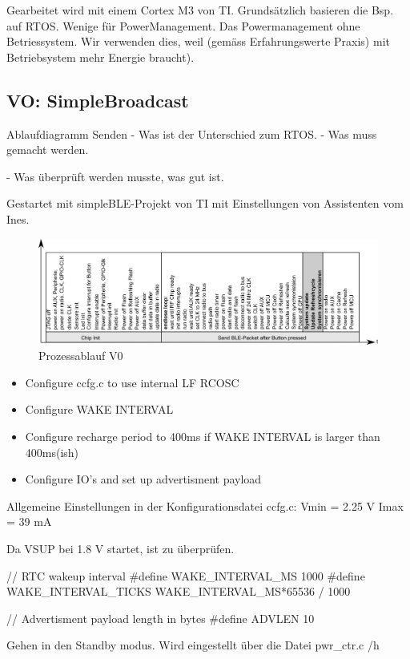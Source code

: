 Gearbeitet wird mit einem Cortex M3 von TI. 
Grundsätzlich basieren die Bsp. auf RTOS. Wenige für PowerManagement. Das Powermanagement ohne Betriessystem. Wir verwenden dies, weil (gemäss Erfahrungswerte Praxis) mit Betriebsystem mehr Energie braucht).

\subsection{VO: SimpleBroadcast}
Ablaufdiagramm Senden
- Was ist der Unterschied zum RTOS.
- Was muss gemacht werden.

- Was überprüft werden musste, was gut ist.

Gestartet mit simpleBLE-Projekt von TI mit Einstellungen von Assistenten vom Ines.

\begin{figure}
  \includegraphics{../ressources/SimpleLink/V0Sendeablauf.png}
  \caption{Prozessablauf V0}
\end{figure}




\begin{itemize}
    \item Configure ccfg.c to use internal LF RCOSC
    \item Configure WAKE INTERVAL
    \item Configure recharge period to 400ms if WAKE INTERVAL is larger than 400ms(ish)
    \item Configure IO's and set up advertisment payload       
\end{itemize}

Allgemeine Einstellungen in der Konfigurationsdatei ccfg.c:
Vmin = 2.25 V
Imax = 39 mA


Da VSUP bei 1.8 V startet, ist zu überprüfen. 


// RTC wakeup interval
\#define WAKE\_INTERVAL\_MS 		1000
\#define WAKE\_INTERVAL\_TICKS 	WAKE\_INTERVAL\_MS*65536 / 1000


// Advertisment payload length in bytes
\#define ADVLEN 10


Gehen in den Standby modus. Wird eingestellt über die Datei pwr\_ctr.c /h

